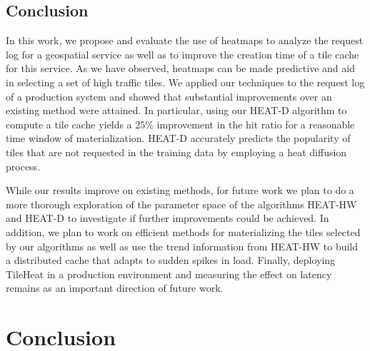 \documentclass[11pt, oneside]{report}
\begin{document}
\section{Conclusion}
In this work, we propose and evaluate the use of heatmaps to analyze the request log for a geospatial service as well as to improve the creation time of a tile cache for this service. 
As we have observed, heatmaps can be made predictive and aid in selecting a set of high traffic tiles. We applied our techniques to the request log of a production system and showed that substantial improvements over an existing method were attained. In particular, using our HEAT-D algorithm to compute a tile cache yields a $25\%$ improvement in the hit ratio for a reasonable time window of materialization. HEAT-D accurately predicts the popularity of tiles that are not requested in the training data by employing a heat diffusion process. 

While our results improve on existing methods, for future work we plan to do a more thorough exploration of the parameter space of the algorithms HEAT-HW and HEAT-D to investigate if further improvements could be achieved. In addition, we plan to work on efficient methods for materializing the tiles selected by our algorithms as well as use the trend information from HEAT-HW to build a distributed cache that adapts to sudden spikes in load. 
Finally, deploying TileHeat in a production environment and measuring the effect on latency remains as an important direction of future work.


\chapter{Conclusion}



\end{document}

